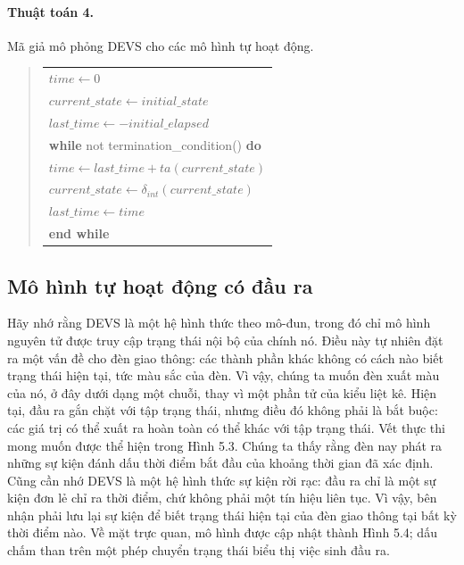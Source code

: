 \paragraph{Thuật toán 4.} Mã giả mô phỏng DEVS cho các mô hình tự hoạt động.
\begin{quote}
\begin{tabular}{l}
$time\leftarrow 0$\\
$current\_state\leftarrow initial\_state$\\
$last\_time\leftarrow -initial\_elapsed$\\
\textbf{while} not termination\_condition() \textbf{do}\\
\quad $time\leftarrow last\_time+ta(current\_state)$\\
\quad $current\_state\leftarrow\delta_{int}(current\_state)$\\
\quad $last\_time\leftarrow time$\\
\textbf{end while}
\end{tabular}
\end{quote}

\subsection{Mô hình tự hoạt động có đầu ra}
Hãy nhớ rằng DEVS là một hệ hình thức theo mô-đun, trong đó chỉ mô hình nguyên tử được truy cập trạng thái nội bộ của chính nó. Điều này tự nhiên đặt ra một vấn đề cho đèn giao thông: các thành phần khác không có cách nào biết trạng thái hiện tại, tức màu sắc của đèn. Vì vậy, chúng ta muốn đèn xuất màu của nó, ở đây dưới dạng một chuỗi, thay vì một phần tử của kiểu liệt kê. Hiện tại, đầu ra gắn chặt với tập trạng thái, nhưng điều đó không phải là bắt buộc: các giá trị có thể xuất ra hoàn toàn có thể khác với tập trạng thái. Vết thực thi mong muốn được thể hiện trong Hình 5.3. Chúng ta thấy rằng đèn nay phát ra những sự kiện đánh dấu thời điểm bắt đầu của khoảng thời gian đã xác định. Cũng cần nhớ DEVS là một hệ hình thức sự kiện rời rạc: đầu ra chỉ là một sự kiện đơn lẻ chỉ ra thời điểm, chứ không phải một tín hiệu liên tục. Vì vậy, bên nhận phải lưu lại sự kiện để biết trạng thái hiện tại của đèn giao thông tại bất kỳ thời điểm nào. Về mặt trực quan, mô hình được cập nhật thành Hình 5.4; dấu chấm than trên một phép chuyển trạng thái biểu thị việc sinh đầu ra.

